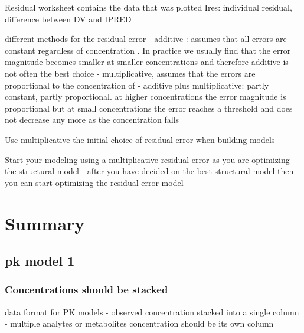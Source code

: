 \documentclass[
  letterpaper,
  DIV=11,
  numbers=noendperiod]{scrreprt}
\begin{document}
Residual worksheet contains the data that was plotted Ires: individual
residual, difference between DV and IPRED

different methods for the residual error - additive : assumes that all
errors are constant regardless of concentration . In practice we usually
find that the error magnitude becomes smaller at smaller concentrations
and therefore additive is not often the best choice - multiplicative,
assumes that the errors are proportional to the concentration of -
additive plus multiplicative: partly constant, partly proportional. at
higher concentrations the error magnitude is proportional but at small
concentrations the error reaches a threshold and does not decrease any
more as the concentration falls

Use multiplicative the initial choice of residual error when building
models

Start your modeling using a multiplicative residual error as you are
optimizing the structural model - after you have decided on the best
structural model then you can start optimizing the residual error model


\hypertarget{summary}{%
\chapter{Summary}\label{summary}}

\hypertarget{pk-model-1}{%
\section{pk model 1}\label{pk-model-1}}

\hypertarget{concentrations-should-be-stacked}{%
\subsection{Concentrations should be
stacked}\label{concentrations-should-be-stacked}}

data format for PK models - observed concentration stacked into a single
column - multiple analytes or metabolites concentration should be its
own column
\end{document}
